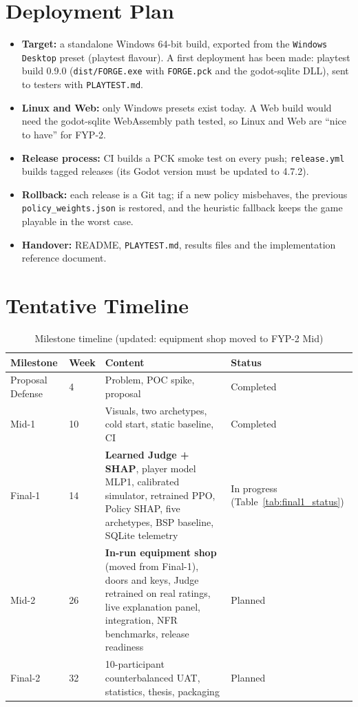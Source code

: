 \section{Deployment Plan}
\begin{itemize}
    \item \textbf{Target:} a standalone Windows 64-bit build, exported from the \texttt{Windows Desktop} preset (playtest flavour). A first deployment has been made: playtest build 0.9.0 (\texttt{dist/FORGE.exe} with \texttt{FORGE.pck} and the godot-sqlite DLL), sent to testers with \texttt{PLAYTEST.md}.
    \item \textbf{Linux and Web:} only Windows presets exist today. A Web build would need the godot-sqlite WebAssembly path tested, so Linux and Web are ``nice to have'' for FYP-2.
    \item \textbf{Release process:} CI builds a PCK smoke test on every push; \texttt{release.yml} builds tagged releases (its Godot version must be updated to 4.7.2).
    \item \textbf{Rollback:} each release is a Git tag; if a new policy misbehaves, the previous \texttt{policy\_weights.json} is restored, and the heuristic fallback keeps the game playable in the worst case.
    \item \textbf{Handover:} README, \texttt{PLAYTEST.md}, results files and the implementation reference document.
\end{itemize}

\section{Tentative Timeline}
\begin{table}[!htbp]
\centering
\caption{Milestone timeline (updated: equipment shop moved to FYP-2 Mid)}
\label{tab:gantt_plan}
\scriptsize
\begin{tabular}{p{}p{}p{}p{}}
\toprule
\textbf{Milestone} & \textbf{Week} & \textbf{Content} & \textbf{Status} \\
\midrule
Proposal Defense & 4 & Problem, POC spike, proposal & Completed \\
Mid-1 & 10 & Visuals, two archetypes, cold start, static baseline, CI & Completed \\
Final-1 & 14 & \textbf{Learned Judge + SHAP}, player model MLP1, calibrated simulator, retrained PPO, Policy SHAP, five archetypes, BSP baseline, SQLite telemetry & In progress (Table~\ref{tab:final1_status}) \\
Mid-2 & 26 & \textbf{In-run equipment shop} (moved from Final-1), doors and keys, Judge retrained on real ratings, live explanation panel, integration, NFR benchmarks, release readiness & Planned \\
Final-2 & 32 & 10-participant counterbalanced UAT, statistics, thesis, packaging & Planned \\
\bottomrule
\end{tabular}
\end{table}

